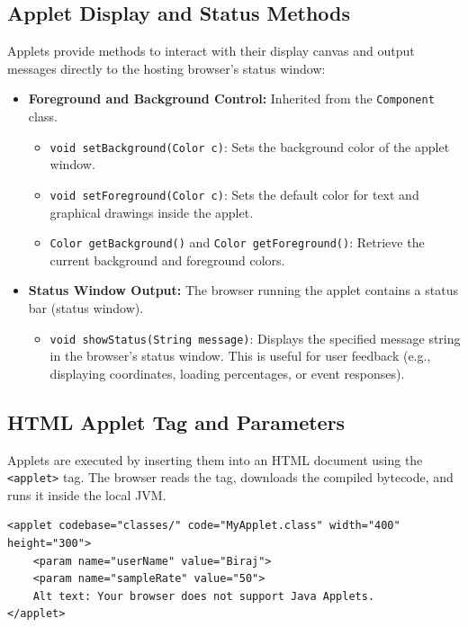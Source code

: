 \documentclass[12pt,a4paper]{article}
\begin{document}
\subsection{Applet Display and Status Methods}
Applets provide methods to interact with their display canvas and output messages directly to the hosting browser's status window:
\begin{itemize}[leftmargin=*, itemsep=3.5pt]
  \item \textbf{Foreground and Background Control:} Inherited from the \texttt{Component} class.
  \begin{itemize}[label=\(\circ\), leftmargin=1.5em]
    \item \texttt{void setBackground(Color c)}: Sets the background color of the applet window.
    \item \texttt{void setForeground(Color c)}: Sets the default color for text and graphical drawings inside the applet.
    \item \texttt{Color getBackground()} and \texttt{Color getForeground()}: Retrieve the current background and foreground colors.
  \end{itemize}
  \item \textbf{Status Window Output:} The browser running the applet contains a status bar (status window).
  \begin{itemize}[label=\(\circ\), leftmargin=1.5em]
    \item \texttt{void showStatus(String message)}: Displays the specified message string in the browser's status window. This is useful for user feedback (e.g., displaying coordinates, loading percentages, or event responses).
  \end{itemize}
\end{itemize}

\subsection{HTML Applet Tag and Parameters}
Applets are executed by inserting them into an HTML document using the \texttt{<applet>} tag. The browser reads the tag, downloads the compiled bytecode, and runs it inside the local JVM.

\begin{tcolorbox}[formulabox, title={\textbf{HTML <applet> Tag Syntax and Attributes}}]
\begin{verbatim}
<applet codebase="classes/" code="MyApplet.class" width="400" height="300">
    <param name="userName" value="Biraj">
    <param name="sampleRate" value="50">
    Alt text: Your browser does not support Java Applets.
</applet>
\end{verbatim}
\end{tcolorbox}
\end{document}
